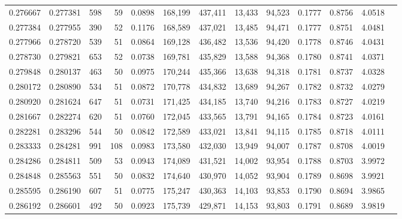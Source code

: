 \begin{tabular}{rrrrrrrrrrrrr}
0.276667 & 0.277381 &    598 &    59 &                                     0.0898 & 168,199 & 437,411 &  13,433 &  94,523 & 0.1777 & 0.8756 & 4.0518 \\
0.277384 & 0.277955 &    390 &    52 &                                     0.1176 & 168,589 & 437,021 &  13,485 &  94,471 & 0.1777 & 0.8751 & 4.0481 \\
0.277966 & 0.278720 &    539 &    51 &                                     0.0864 & 169,128 & 436,482 &  13,536 &  94,420 & 0.1778 & 0.8746 & 4.0431 \\
0.278730 & 0.279821 &    653 &    52 &                                     0.0738 & 169,781 & 435,829 &  13,588 &  94,368 & 0.1780 & 0.8741 & 4.0371 \\
0.279848 & 0.280137 &    463 &    50 &                                     0.0975 & 170,244 & 435,366 &  13,638 &  94,318 & 0.1781 & 0.8737 & 4.0328 \\
0.280172 & 0.280890 &    534 &    51 &                                     0.0872 & 170,778 & 434,832 &  13,689 &  94,267 & 0.1782 & 0.8732 & 4.0279 \\
0.280920 & 0.281624 &    647 &    51 &                                     0.0731 & 171,425 & 434,185 &  13,740 &  94,216 & 0.1783 & 0.8727 & 4.0219 \\
0.281667 & 0.282274 &    620 &    51 &                                     0.0760 & 172,045 & 433,565 &  13,791 &  94,165 & 0.1784 & 0.8723 & 4.0161 \\
0.282281 & 0.283296 &    544 &    50 &                                     0.0842 & 172,589 & 433,021 &  13,841 &  94,115 & 0.1785 & 0.8718 & 4.0111 \\
0.283333 & 0.284281 &    991 &   108 &                                     0.0983 & 173,580 & 432,030 &  13,949 &  94,007 & 0.1787 & 0.8708 & 4.0019 \\
0.284286 & 0.284811 &    509 &    53 &                                     0.0943 & 174,089 & 431,521 &  14,002 &  93,954 & 0.1788 & 0.8703 & 3.9972 \\
0.284848 & 0.285563 &    551 &    50 &                                     0.0832 & 174,640 & 430,970 &  14,052 &  93,904 & 0.1789 & 0.8698 & 3.9921 \\
0.285595 & 0.286190 &    607 &    51 &                                     0.0775 & 175,247 & 430,363 &  14,103 &  93,853 & 0.1790 & 0.8694 & 3.9865 \\
0.286192 & 0.286601 &    492 &    50 &                                     0.0923 & 175,739 & 429,871 &  14,153 &  93,803 & 0.1791 & 0.8689 & 3.9819 \\

\end{tabular}
